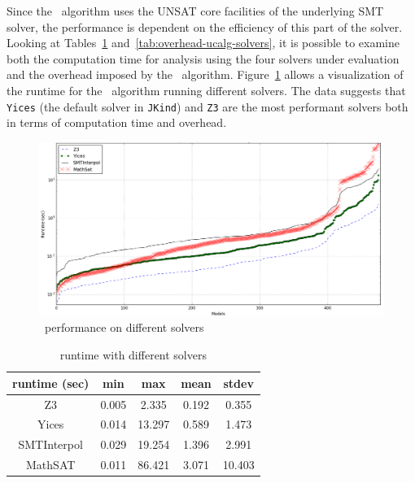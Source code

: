Since the \ucalg\ algorithm uses the UNSAT core facilities of the
underlying SMT solver, the performance is dependent on the efficiency
of this part of the solver. Looking at Tables~\ref{tab:runtime-ucalg-solvers}
and~\ref{tab:overhead-ucalg-solvers}, it is possible to examine both the
computation time for analysis using the four solvers under evaluation
and the overhead imposed by the \ucalg\ algorithm.
Figure~\ref{fig:perf-solvers} allows a visualization of the runtime for
the \ucalg\ algorithm running different solvers. The data suggests that
\texttt{Yices} (the default solver in \texttt{JKind}) and \texttt{Z3} are the most performant
solvers both in terms of computation time and overhead.

\begin{figure}
  \centering
  \includegraphics[width=\textwidth]{figs/performance_solvers.png}
    \vspace{-0.1in}
  \caption{\ucalg\ performance on different solvers}
  \label{fig:perf-solvers}
\end{figure}

\begin{table}
  \caption{\ucalg runtime with different solvers}
  \centering
  \begin{tabular}{ |c||c|c|c|c| }
    \hline
     runtime (sec) & min & max & mean & stdev \\[0.5ex]
    \hline\hline
    Z3   & 0.005 & 2.335 & 0.192 & 0.355 \\[0.5ex]
    Yices &   0.014  & 13.297   & 0.589 & 1.473 \\[0.5ex]
    SMTInterpol& 0.029 & 19.254 &  1.396 & 2.991 \\[0.5ex]
    MathSAT & 0.011 & 86.421 &  3.071 & 10.403 \\[0.5ex]
    \hline
  \end{tabular} \\
  \label{tab:runtime-ucalg-solvers}
\end{table}

